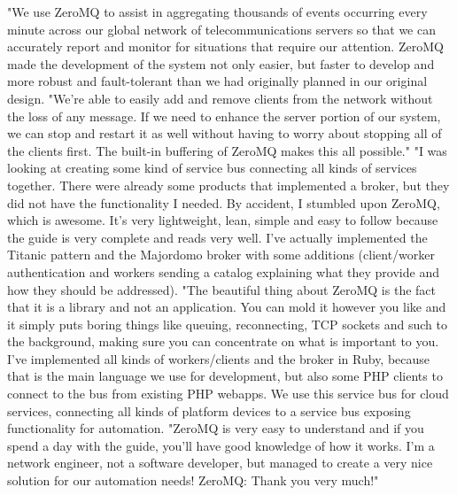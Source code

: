 \documentclass[a4paper,12pt]{report}
\begin{document}
"We use ZeroMQ to assist in aggregating thousands of events occurring every minute across our global
network of telecommunications servers so that we can accurately report and monitor for situations that
require our attention. ZeroMQ made the development of the system not only easier, but faster to develop
and more robust and fault-tolerant than we had originally planned in our original design.
"We’re able to easily add and remove clients from the network without the loss of any message. If we
need to enhance the server portion of our system, we can stop and restart it as well without having to
worry about stopping all of the clients ﬁrst. The built-in buffering of ZeroMQ makes this all possible."
"I was looking at creating some kind of service bus connecting all kinds of services together. There were
already some products that implemented a broker, but they did not have the functionality I needed. By
accident, I stumbled upon ZeroMQ, which is awesome. It’s very lightweight, lean, simple and easy to
follow because the guide is very complete and reads very well. I’ve actually implemented the Titanic
pattern and the Majordomo broker with some additions (client/worker authentication and workers
sending a catalog explaining what they provide and how they should be addressed).
"The beautiful thing about ZeroMQ is the fact that it is a library and not an application. You can mold it
however you like and it simply puts boring things like queuing, reconnecting, TCP sockets and such to
the background, making sure you can concentrate on what is important to you. I’ve implemented all
kinds of workers/clients and the broker in Ruby, because that is the main language we use for
development, but also some PHP clients to connect to the bus from existing PHP webapps. We use this
service bus for cloud services, connecting all kinds of platform devices to a service bus exposing
functionality for automation.
"ZeroMQ is very easy to understand and if you spend a day with the guide, you’ll have good knowledge
of how it works. I’m a network engineer, not a software developer, but managed to create a very nice
solution for our automation needs! ZeroMQ: Thank you very much!"

\newpage 
\end{document}
